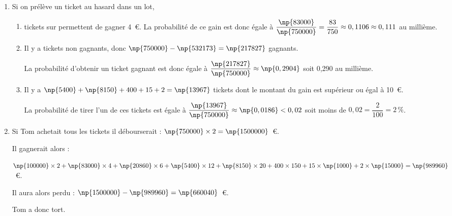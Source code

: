 \begin{enumerate}
\item Si on prélève un ticket au hasard dans un lot,
	\begin{enumerate}
		\item %
 tickets sur  permettent de gagner 4~\euro. La probabilité de ce gain est donc égale à $\dfrac{\np{83000}}{\np{750000}} = \dfrac{83}{750} \approx 0,1106 \approx 0,111$ au millième.
		\item %
Il y a  tickets non gagnants, donc $\np{750000} - \np{532173} = \np{217827}$ gagnants.

La probabilité d'obtenir un ticket gagnant est donc égale à $\dfrac{\np{217827}}{\np{750000}} \approx  \np{0,2904}$ soit 0,290 au millième.

		\item %
Il y a $\np{5400} + \np{8150} + 400 + 15 + 2 = \np{13967}$ tickets dont le \og montant du gain \fg{} est supérieur ou égal à  10~\euro.

La probabilité de tirer l'un de ces tickets est égale à $\dfrac{\np{13967}}{\np{750000}} \approx \np{0,0186} < 0,02$ soit moins de $0,02 = \dfrac{2}{100} = 2\,\%$.
	\end{enumerate}
\item %
	
Si Tom achetait tous les tickets il débourserait : $\np{750000} \times 2 = \np{1500000}$~\euro.

Il gagnerait alors :

$\np{100000} \times 2 + \np{83000} \times 4 + \np{20860} \times 6 + \np{5400} \times 12 + \np{8150} \times 20 + 400 \times 150 + 15 \times \np{1000} + 2 \times \np{15000} = \np{989960}$~\euro.

Il aura alors perdu : $\np{1500000} - \np{989960} = \np{660040}$~\euro.

Tom a donc tort.
\end{enumerate}

\bigskip

